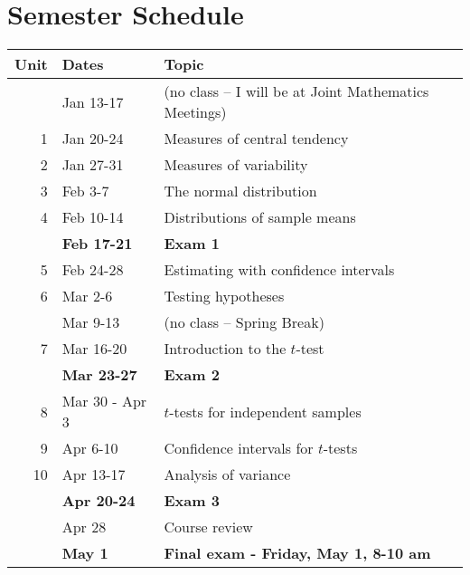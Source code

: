 \documentclass[10pt]{article}
\begin{document}
\section*{Semester Schedule}
\label{sec:orgd1b936a}
\begin{center}
\begin{tabular}{rll}
Unit & Dates & Topic\\
\hline
 & Jan 13-17 & (no class -- I will be at Joint Mathematics Meetings)\\
1 & Jan 20-24 & Measures of central tendency\\
2 & Jan 27-31 & Measures of variability\\
3 & Feb 3-7 & The normal distribution\\
4 & Feb 10-14 & Distributions of sample means\\
 & \textbf{Feb 17-21} & \textbf{Exam 1}\\
5 & Feb 24-28 & Estimating with confidence intervals\\
6 & Mar 2-6 & Testing hypotheses\\
 & Mar 9-13 & (no class -- Spring Break)\\
7 & Mar 16-20 & Introduction to the \(t\)-test\\
 & \textbf{Mar 23-27} & \textbf{Exam 2}\\
8 & Mar 30 - Apr 3 & \(t\)-tests for independent samples\\
9 & Apr 6-10 & Confidence intervals for \(t\)-tests\\
10 & Apr 13-17 & Analysis of variance\\
 & \textbf{Apr 20-24} & \textbf{Exam 3}\\
 & Apr 28 & Course review\\
 & \textbf{May 1} & \textbf{Final exam - Friday, May 1, 8-10 am}\\
\end{tabular}
\end{center}
\end{document}
